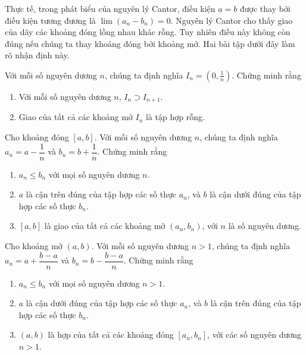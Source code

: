 Thực tế, trong phát biểu của nguyên lý Cantor, điều kiện $a = b$ được thay bởi điều kiện tương đương là $\lim (a_{n} - b_{n}) = 0$. Nguyên lý Cantor cho thấy giao của dãy các khoảng đóng lồng nhau khác rỗng. Tuy nhiên điều này không còn đúng nếu chúng ta thay khoảng đóng bởi khoảng mở. Hai bài tập dưới đây làm rõ nhận định này.

\begin{exercise}
	Với mỗi số nguyên dương $n$, chúng ta định nghĩa $I_{n} = (0, \frac{1}{n})$. Chứng minh rằng
	\begin{enumerate}[label={(\roman*)}]
		\item Với mỗi số nguyên dương $n$, $I_{n}\supset I_{n+1}$.
		\item Giao của tất cả các khoảng mở $I_{n}$ là tập hợp rỗng.
	\end{enumerate}
\end{exercise}

\begin{exercise}
	Cho khoảng đóng $[a, b]$. Với mỗi số nguyên dương $n$, chúng ta định nghĩa $a_{n} = a - \dfrac{1}{n}$ và $b_{n} = b + \dfrac{1}{n}$. Chứng minh rằng
	\begin{enumerate}[label={(\roman*)}]
		\item $a_{n}\leq b_{n}$ với mọi số nguyên dương $n$.
		\item $a$ là cận trên đúng của tập hợp các số thực $a_{n}$, và $b$ là cận dưới đúng của tập hợp các số thực $b_{n}$.
		\item $[a, b]$ là giao của tất cả các khoảng mở $(a_{n}, b_{n})$, với $n$ là số nguyên dương.
	\end{enumerate}
\end{exercise}

\begin{exercise}
	Cho khoảng mở $(a, b)$. Với mỗi số nguyên dương $n > 1$, chúng ta định nghĩa $a_{n} = a + \dfrac{b-a}{n}$ và $b_{n} = b - \dfrac{b-a}{n}$. Chứng minh rằng
	\begin{enumerate}[label={(\roman*)}]
		\item $a_{n}\leq b_{n}$ với mọi số nguyên dương $n > 1$.
		\item $a$ là cận dưới đúng của tập hợp các số thực $a_{n}$, và $b$ là cận trên đúng của tập hợp các số thực $b_{n}$.
		\item $(a, b)$ là hợp của tất cả các khoảng đóng $[a_{n}, b_{n}]$, với các số nguyên dương $n > 1$.
	\end{enumerate}
\end{exercise}

